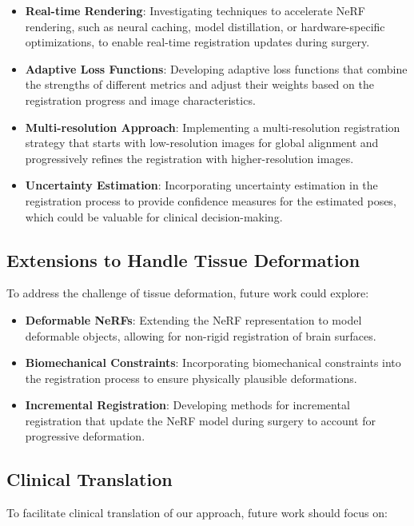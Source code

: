 \begin{itemize}
    \item \textbf{Real-time Rendering}: Investigating techniques to accelerate NeRF rendering, such as neural caching, model distillation, or hardware-specific optimizations, to enable real-time registration updates during surgery.
    
    \item \textbf{Adaptive Loss Functions}: Developing adaptive loss functions that combine the strengths of different metrics and adjust their weights based on the registration progress and image characteristics.
    
    \item \textbf{Multi-resolution Approach}: Implementing a multi-resolution registration strategy that starts with low-resolution images for global alignment and progressively refines the registration with higher-resolution images.
    
    \item \textbf{Uncertainty Estimation}: Incorporating uncertainty estimation in the registration process to provide confidence measures for the estimated poses, which could be valuable for clinical decision-making.
\end{itemize}

\subsection{Extensions to Handle Tissue Deformation}
To address the challenge of tissue deformation, future work could explore:

\begin{itemize}
    \item \textbf{Deformable NeRFs}: Extending the NeRF representation to model deformable objects, allowing for non-rigid registration of brain surfaces.
    
    \item \textbf{Biomechanical Constraints}: Incorporating biomechanical constraints into the registration process to ensure physically plausible deformations.
    
    \item \textbf{Incremental Registration}: Developing methods for incremental registration that update the NeRF model during surgery to account for progressive deformation.
\end{itemize}

\subsection{Clinical Translation}
To facilitate clinical translation of our approach, future work should focus on:

